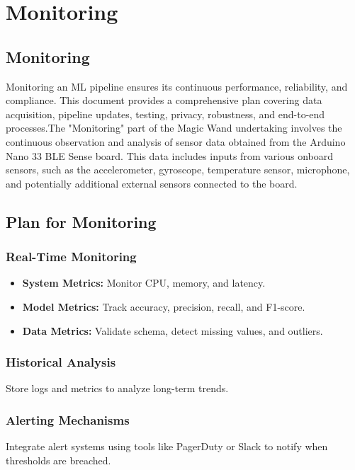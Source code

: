 %
%

\chapter{Monitoring}

\section{Monitoring}
Monitoring an ML pipeline ensures its continuous performance, reliability, and compliance. This document provides a comprehensive plan covering data acquisition, pipeline updates, testing, privacy, robustness, and end-to-end processes.The "Monitoring" part of the Magic Wand undertaking involves the continuous observation and analysis of sensor data obtained from the Arduino Nano 33 BLE Sense board. This data includes inputs from various onboard sensors, such as the accelerometer, gyroscope, temperature sensor, microphone, and potentially additional external sensors connected to the board.

\section{Plan for Monitoring}
\subsection{Real-Time Monitoring}
\begin{itemize}
    \item \textbf{System Metrics:} Monitor CPU, memory, and latency.
    \item \textbf{Model Metrics:} Track accuracy, precision, recall, and F1-score.
    \item \textbf{Data Metrics:} Validate schema, detect missing values, and outliers.
\end{itemize}

\subsection{Historical Analysis}
Store logs and metrics to analyze long-term trends.

\subsection{Alerting Mechanisms}
Integrate alert systems using tools like PagerDuty or Slack to notify when thresholds are breached.

